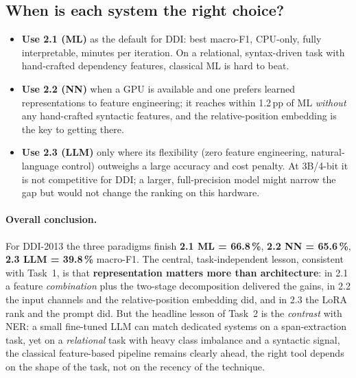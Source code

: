 \documentclass[a4paper,11pt]{article}
\begin{document}
\subsection{When is each system the right choice?}
\begin{itemize}
\item \textbf{Use 2.1 (ML)} as the default for DDI: best macro-F1,
CPU-only, fully interpretable, minutes per iteration. On a relational,
syntax-driven task with hand-crafted dependency features, classical ML
is hard to beat.
\item \textbf{Use 2.2 (NN)} when a GPU is available and one prefers
learned representations to feature engineering; it reaches within 1.2\,pp
of ML \emph{without} any hand-crafted syntactic features, and the
relative-position embedding is the key to getting there.
\item \textbf{Use 2.3 (LLM)} only where its flexibility (zero feature
engineering, natural-language control) outweighs a large accuracy and
cost penalty. At 3B/4-bit it is not competitive for DDI; a larger,
full-precision model might narrow the gap but would not change the
ranking on this hardware.
\end{itemize}

\paragraph{Overall conclusion.}
For DDI-2013 the three paradigms finish \textbf{2.1 ML = 66.8\,\%},
\textbf{2.2 NN = 65.6\,\%}, \textbf{2.3 LLM = 39.8\,\%} macro-F1. The
central, task-independent lesson, consistent with Task~1, is that
\textbf{representation matters more than architecture}: in 2.1 a feature
\emph{combination} plus the two-stage decomposition delivered the gains,
in 2.2 the input channels and the relative-position embedding did, and
in 2.3 the LoRA rank and the prompt did. But the headline lesson of
Task~2 is the \emph{contrast} with NER: a small fine-tuned LLM can match
dedicated systems on a span-extraction task, yet on a \emph{relational}
task with heavy class imbalance and a syntactic signal, the classical
feature-based pipeline remains clearly ahead, the right tool depends
on the shape of the task, not on the recency of the technique.
\end{document}
